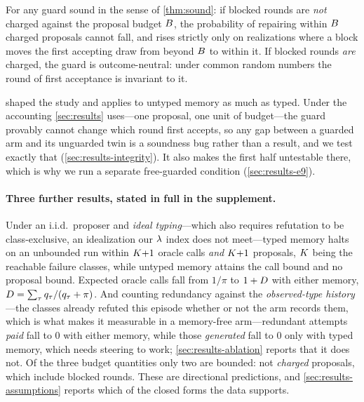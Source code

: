 \begin{corollary}
\label{cor:budget}
For any guard sound in the sense of \cref{thm:sound}: if blocked rounds are
\emph{not} charged against the proposal budget $B$, the probability of
repairing within $B$ charged proposals cannot fall, and rises strictly
only on realizations where a block moves the first accepting draw from beyond
$B$ to within it. If blocked rounds \emph{are} charged, the guard
is outcome-neutral: under common random numbers the round of first acceptance
is invariant to it.
\end{corollary}

 shaped the study and applies to untyped memory as much as
typed. Under the accounting \cref{sec:results} uses---one proposal, one unit of
budget---the guard provably cannot change which round first accepts, so any gap
between a guarded arm and its unguarded twin is a soundness bug rather than a
result, and we test exactly that (\cref{sec:results-integrity}). It also makes
the first half untestable there, which is why we run a separate free-guarded
condition (\cref{sec:results-e9}).

\paragraph{Three further results, stated in full in the supplement.}
Under an i.i.d.\ proposer and \emph{ideal typing}---which also requires
refutation to be class-exclusive, an idealization our $\lambda$ index does not
meet---typed memory halts on an unbounded run within $K{+}1$ oracle calls
\emph{and} $K{+}1$ proposals, $K$ being the reachable failure
classes, while untyped memory attains the call bound and no proposal bound.
Expected oracle calls fall from $1/\pi$ to $1 + D$ with either memory,
$D = \sum_\tau q_\tau/(q_\tau + \pi)$. And counting redundancy against the
\emph{observed-type history}---the classes already refuted this episode whether
or not the arm records them, which is what makes it measurable in a memory-free
arm---redundant attempts \emph{paid} fall to $0$ with either memory, while
those \emph{generated} fall to $0$ only with typed memory, which needs steering
to work; \cref{sec:results-ablation} reports that it does not. Of the three
budget quantities only two are bounded: not \emph{charged} proposals, which
include blocked rounds. These are directional predictions, and
\cref{sec:results-assumptions} reports which of the closed forms the data
supports.

